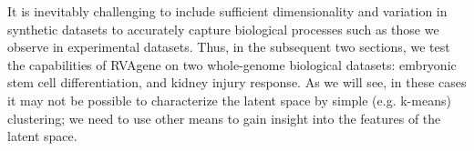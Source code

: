 \par
It is inevitably challenging to include sufficient dimensionality and variation in synthetic datasets to accurately capture biological processes such as those we observe in experimental datasets. Thus, in the subsequent two sections, we test the capabilities of RVAgene on two whole-genome biological datasets: embryonic stem cell differentiation, and kidney injury response. As we will see, in these cases it may not be possible to characterize the latent space by simple (e.g. k-means) clustering; we need to use other means to gain insight into the features of the latent space.


